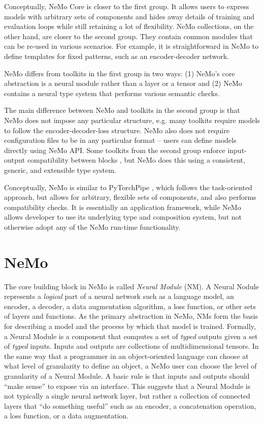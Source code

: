 \documentclass{article}
\begin{document}
Conceptually, NeMo Core is closer to the first group. It allows users to express models with arbitrary sets of components and hides away details of training and evaluation loops while still retaining a lot of flexibility. NeMo collections, on the other hand, are closer to the second group. They contain common modules that can be re-used in various scenarios. For example, it is straightforward in NeMo to define templates for fixed patterns, such as an encoder-decoder network.

NeMo differs from toolkits in the first group in two ways: (1) NeMo's core abstraction is a neural module rather than a layer or a tensor and (2) NeMo contains a neural type system that performs various semantic checks.

The main difference between NeMo and toolkits in the second group is that NeMo does not impose any particular structure, e.g. many toolkits require models to follow the encoder-decoder-loss structure. NeMo also does not require configuration files to be in any particular format -- users can define models directly using NeMo API. Some toolkits from the second group enforce input-output compatibility between blocks \citep{PyTorchPipe}, but NeMo does this using a consistent, generic, and extensible type system.

Conceptually, NeMo is similar to PyTorchPipe \citep{PyTorchPipe}, which follows the task-oriented approach, but allows for arbitrary, flexible sets of components, and also performs compatibility checks. It is essentially an application framework, while NeMo allows developer to use its underlying type and composition system, but not otherwise adopt any of the NeMo run-time functionality. 



\section{NeMo}
The core building block in NeMo is called \textit{Neural Module} (NM). A Neural Nodule represents a \textit{logical} part of a neural network such as a language model, an encoder, a decoder, a data augmentation algorithm, a loss function, or other sets of layers and functions. As the primary abstraction in NeMo, NMs form the basis for describing a model and the process by which that model is trained.  Formally, a Neural Module is a component that computes a set of \textit{typed} outputs given a set of \textit{typed} inputs. Inputs and outputs are collections of multidimensional tensors. In the same way that a programmer in an object-oriented language can choose at what level of granularity to define an object, a NeMo user can choose the level of granularity of a Neural Module. A basic rule is that inputs and outputs should ``make sense'' to expose via an interface.  This suggests that a Neural Module is not typically a single neural network layer, but rather a collection of connected layers that ``do something useful'' such as an encoder, a concatenation operation, a loss function, or a data augmentation.
\end{document}
